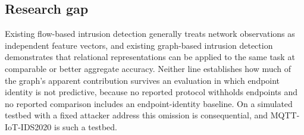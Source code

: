 \subsection{Research gap}

Existing flow-based intrusion detection generally treats network observations
as independent feature vectors, and existing graph-based intrusion detection
demonstrates that relational representations can be applied to the same task at
comparable or better aggregate accuracy. Neither line establishes how much of
the graph's apparent contribution survives an evaluation in which endpoint
identity is not predictive, because no reported protocol withholds endpoints
and no reported comparison includes an endpoint-identity baseline. On a
simulated testbed with a fixed attacker address this omission is consequential,
and MQTT-IoT-IDS2020 is such a testbed.
